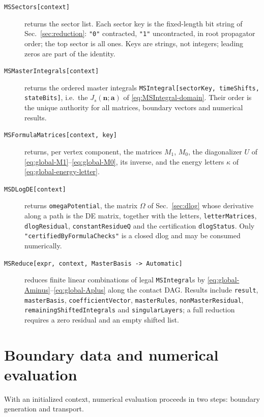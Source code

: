 \documentclass[11pt,a4paper]{article}
\begin{document}
\begin{description}
  \item[\texttt{MSSectors[context]}] returns the sector list. Each sector key is the fixed-length
        bit string of Sec.~\ref{sec:reduction}: \texttt{"0"} contracted, \texttt{"1"}
        uncontracted, in root propagator order; the top sector is all ones. Keys are strings, not
        integers; leading zeros are part of the identity.
  \item[\texttt{MSMasterIntegrals[context]}] returns the ordered master integrals
        \texttt{MSIntegral[sectorKey, timeShifts, stateBits]}, i.e.\ the $J_s(\bm n;\bm a)$ of
        \eqref{eq:MSIntegral-domain}. Their order is the unique authority for all matrices,
        boundary vectors and numerical results.
  \item[\texttt{MSFormulaMatrices[context, key]}] returns, per vertex component, the matrices
        $M_1$, $M_0$, the diagonalizer $U$ of \eqref{eq:global-M1}--\eqref{eq:global-M0}, its
        inverse, and the energy letters $\kappa$ of \eqref{eq:global-energy-letter}.
  \item[\texttt{MSDLogDE[context]}] returns \texttt{omegaPotential}, the matrix $\Omega$ of
        Sec.~\ref{sec:dlog} whose derivative along a path is the DE matrix, together with the
        letters, \texttt{letterMatrices}, \texttt{dlogResidual}, \texttt{constantResidueQ} and the
        certification \texttt{dlogStatus}. Only \texttt{"certifiedByFormulaChecks"} is a closed
        dlog and may be consumed numerically.
  \item[\texttt{MSReduce[expr, context, MasterBasis -> Automatic]}] reduces finite linear
        combinations of legal \texttt{MSIntegral}s by
        \eqref{eq:global-Aminus}--\eqref{eq:global-Aplus} along the contact DAG. Results include
        \texttt{result}, \texttt{masterBasis}, \texttt{coefficientVector}, \texttt{masterRules},
        \texttt{nonMasterResidual}, \texttt{remainingShiftedIntegrals} and
        \texttt{singularLayers}; a full reduction requires a zero residual and an empty shifted
        list.
\end{description}

\section{Boundary data and numerical evaluation}
\label{sec:numerics}

With an initialized context, numerical evaluation proceeds in two steps: boundary generation and
transport.
\end{document}
